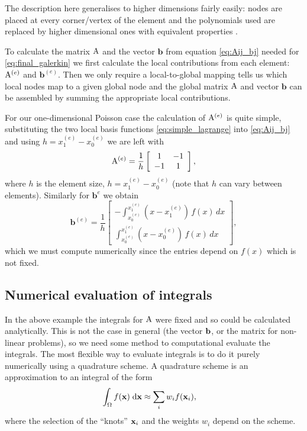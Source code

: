 The description here generalises to higher dimensions fairly easily: nodes are placed at every corner/vertex of the element and the polynomials used are replaced by higher dimensional ones with equivalent properties \cite[20]{HowardElmanDavidSilvester2006}.

To calculate the matrix $\mathrm{A}$ and the vector $\mathbf{b}$ from equation \cref{eq:Aij_bj} needed for \cref{eq:final_galerkin} we first calculate the local contributions from each element: $\mathrm{A}^{(e)}$ and $\mathbf{b}^{(e)}$.
Then we only require a local-to-global mapping tells us which local nodes map to a given global node and the global matrix $\mathrm{A}$ and vector $\mathbf{b}$ can be assembled by summing the appropriate local contributions.

For our one-dimensional Poisson case the calculation of $\mathrm{A}^{(e)}$ is quite
simple, substituting the two local basis functions \cref{eq:simple_lagrange} into
\cref{eq:Aij_bj} and using $h=x_{1}^{(e)}-x_{0}^{(e)}$ we are left with
\begin{equation}
  \mathrm{A}^{(e)} = \dfrac{1}{h}
  \left[
    \begin{array}{cc}
      1 & -1 \\ -1 & 1
    \end{array}
  \right],
\end{equation}
where $h$ is the element size, $h = x_{1}^{(e)}-x_{0}^{(e)}$ (note that $h$ can vary between elements).
Similarly for $\mathbf{b}^{{e}}$ we obtain
\begin{equation}
  \mathbf{b}^{(e)}=\dfrac{1}{h}\left[
    \begin{array}{c}
      -\int_{x_{0}^{(e)}}^{x_{1}^{(e)}}(x-x_{1}^{(e)})\, f(x)\, dx\\
      \int_{x_{0}^{(e)}}^{x_{1}^{(e)}}(x-x_{0}^{(e)})\, f(x)\, dx
    \end{array}\right],
\end{equation}
which we must compute numerically since the entries depend on $f(x)$ which is not fixed.



\subsection{Numerical evaluation of integrals}
\label{sec:numer-eval-integrals}

In the above example the integrals for $\mathrm{A}$ were fixed and so could be calculated analytically.
This is not the case in general (\eg the vector ${\mathbf{b}}$, or the matrix for non-linear problems), so we need some method to computational evaluate the integrals.
The most flexible way to evaluate integrals is to do it purely numerically using a quadrature scheme.
A quadrature scheme is an approximation to an integral of the form
\begin{equation}
  \begin{aligned}
    {\int_{\Omega} {f(\mathbf{x})} {\; \mathrm{{d}}}\mathbf{x}} &\approx  \sum_i w_i f(\mathbf{x}_i),
  \end{aligned}
\end{equation}
where the selection of the ``knots'' $\mathbf{x}_i$ and the weights $w_i$ depend on the scheme.

